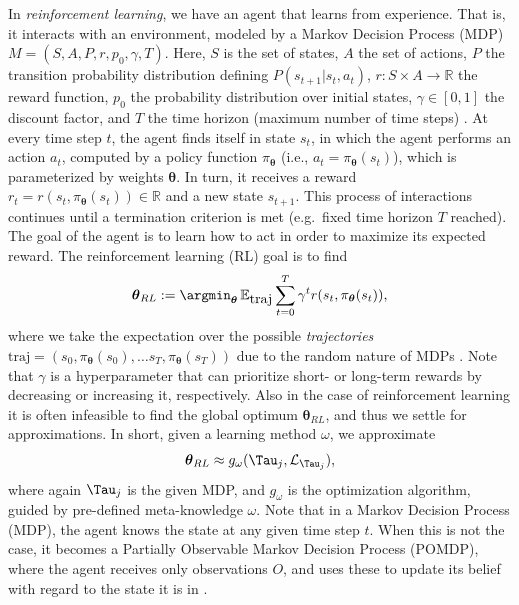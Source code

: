 \label{sec:RL}
In \textit{reinforcement learning}, we have an agent that learns from  experience. That is, it interacts with an environment, modeled by a Markov Decision Process (MDP) $M = (S, A, P, r, p_{0}, \gamma, T)$. Here, $S$ is the set of states, $A$ the set of actions, $P$ the transition probability distribution defining $P(s_{t+1}| s_{t}, a_{t})$, $r: S \times A \rightarrow \mathbb{R}$ the reward function, $p_{0}$ the probability distribution over initial states, $\gamma \in [0,1]$ the discount factor, and $T$ the time horizon (maximum number of time steps) . 
At every time step $t$, the agent finds itself in state $s_{t}$, in which the agent performs an action $a_{t}$, computed by a policy function $\pi_{\boldsymbol{\theta}}$ (i.e., $a_{t} = \pi_{\boldsymbol{\theta}}(s_{t})$), which is parameterized by weights $\boldsymbol{\theta}$. In turn, it receives a reward $r_{t} = r(s_{t}, \pi_{\boldsymbol{\theta}}(s_{t})) \in \mathbb{R}$ and a new state $s_{t+1}$. This process of interactions continues until a termination criterion is met (e.g.\ fixed time horizon $T$ reached). The goal of the agent is to learn how to act in order to maximize its expected reward. The reinforcement learning (RL) goal is to find 
\begin{align}
    \boldsymbol{\theta}_{RL} := \argmin_{\boldsymbol{\theta}} \, \mathbb{E}_{\mbox{traj}} \sum_{t=0}^{T} \gamma^{t}r(s_{t}, \pi_{\boldsymbol{\theta}}(s_{t})),
\end{align}
where we take the expectation over the possible \textit{trajectories} $\mbox{traj} = (s_{0}, \pi_{\boldsymbol{\theta}}(s_{0}), \allowbreak \ldots s_{T}, \pi_{\boldsymbol{\theta}}(s_{T}))$ due to the random nature of MDPs . Note that $\gamma$ is a hyperparameter that can prioritize short- or long-term rewards by decreasing or increasing it, respectively.
Also in the case of reinforcement learning it is often infeasible to find  the global optimum $\boldsymbol{\theta}_{RL}$, and thus we  settle for  approximations. In short, given a learning method $\omega$, we approximate 
\begin{align}
    \boldsymbol{\theta}_{RL} \approx g_{\omega}(\Tau_{j}, \mathcal{L}_{\Tau_{j}}),
\end{align}
where again $\Tau_{j}$ is the given MDP, and $g_{\omega}$ is the optimization algorithm, guided by pre-defined meta-knowledge $\omega$.
Note that in a Markov Decision Process (MDP), the agent knows the state at any given time step $t$. When this is not the case, it becomes a Partially Observable Markov Decision Process (POMDP), where the agent receives only observations $O$, and uses these to update its belief with regard to the state it is in .

